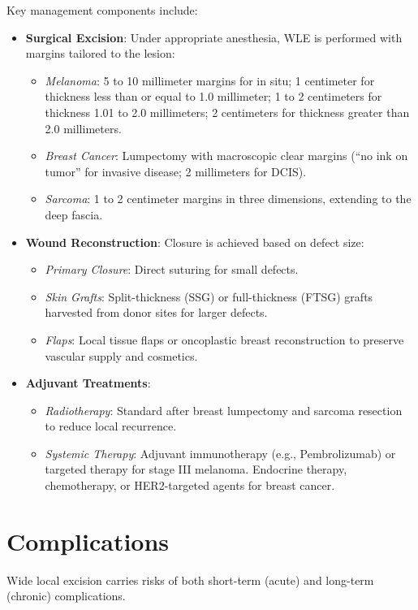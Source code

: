 Key management components include:
\begin{itemize}
    \item \textbf{Surgical Excision}: Under appropriate anesthesia, WLE is performed with margins tailored to the lesion:
    \begin{itemize}
        \item \textit{Melanoma}: 5 to 10 millimeter margins for in situ; 1 centimeter for thickness less than or equal to 1.0 millimeter; 1 to 2 centimeters for thickness 1.01 to 2.0 millimeters; 2 centimeters for thickness greater than 2.0 millimeters.
        \item \textit{Breast Cancer}: Lumpectomy with macroscopic clear margins (``no ink on tumor'' for invasive disease; 2 millimeters for DCIS).
        \item \textit{Sarcoma}: 1 to 2 centimeter margins in three dimensions, extending to the deep fascia.
    \end{itemize}
    \item \textbf{Wound Reconstruction}: Closure is achieved based on defect size:
    \begin{itemize}
        \item \textit{Primary Closure}: Direct suturing for small defects.
        \item \textit{Skin Grafts}: Split-thickness (SSG) or full-thickness (FTSG) grafts harvested from donor sites for larger defects.
        \item \textit{Flaps}: Local tissue flaps or oncoplastic breast reconstruction to preserve vascular supply and cosmetics.
    \end{itemize}
    \item \textbf{Adjuvant Treatments}:
    \begin{itemize}
        \item \textit{Radiotherapy}: Standard after breast lumpectomy and sarcoma resection to reduce local recurrence.
        \item \textit{Systemic Therapy}: Adjuvant immunotherapy (e.g., Pembrolizumab) or targeted therapy for stage III melanoma. Endocrine therapy, chemotherapy, or HER2-targeted agents for breast cancer.
    \end{itemize}
\end{itemize}

\section*{Complications}
Wide local excision carries risks of both short-term (acute) and long-term (chronic) complications.

